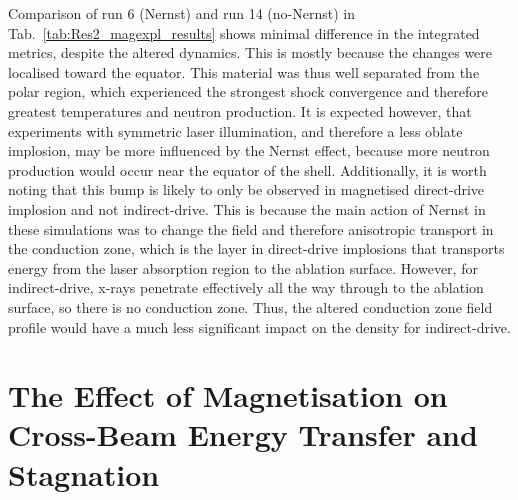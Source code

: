 Comparison of run 6 (Nernst) and run 14 (no-Nernst) in Tab.~\ref{tab:Res2_magexpl_results} shows minimal difference in the integrated metrics, despite the altered dynamics.
This is mostly because the changes were localised toward the equator.
This material was thus well separated from the polar region, which experienced the strongest shock convergence and therefore greatest temperatures and neutron production.
It is expected however, that experiments with symmetric laser illumination, and therefore a less oblate implosion, may be more influenced by the Nernst effect, because more neutron production would occur near the equator of the shell.
Additionally, it is worth noting that this bump is likely to only be observed in magnetised direct-drive implosion and not indirect-drive.
This is because the main action of Nernst in these simulations was to change the field and therefore anisotropic transport in the conduction zone, which is the layer in direct-drive implosions that transports energy from the laser absorption region to the ablation surface.
However, for indirect-drive, x-rays penetrate effectively all the way through to the ablation surface, so there is no conduction zone.
Thus, the altered conduction zone field profile would have a much less significant impact on the density for indirect-drive.

\section{The Effect of Magnetisation on Cross-Beam Energy Transfer and Stagnation}%
\label{sec:Res2_mag_on_CBET}

